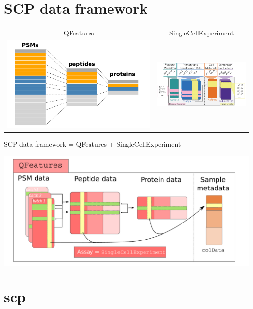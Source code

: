 \documentclass{article}
\newcommand{\hcode}[2][lgray]{{\ttfamily\color{vdgray}\colorbox{#1}{#2}}}
\begin{document}
\begin{multicols}{2}
\begin{minipage}[t]{\linewidth}
  \section*{\huge SCP data framework}
  
  \begin{tabular}{cc}
    \hcode{QFeatures} & \hcode{SingleCellExperiment} \\
    \includegraphics[width=0.4\linewidth]{figs/QFeatures.pdf} &
    \includegraphics[width=0.5\linewidth]{figs/SingleCellExperiment.png} 
  \end{tabular}
  
  \large
  SCP data framework = \hcode{QFeatures} + \hcode{SingleCellExperiment} 
  
  \centering
  \includegraphics[width=0.8\linewidth]{figs/SCP_framework.pdf}
\end{minipage}

\noindent
\begin{minipage}[t]{\linewidth}
  \vspace{0.55cm}
  \section*{\huge \hcode{scp}}
  

\end{minipage}
\end{multicols}
\end{document}
